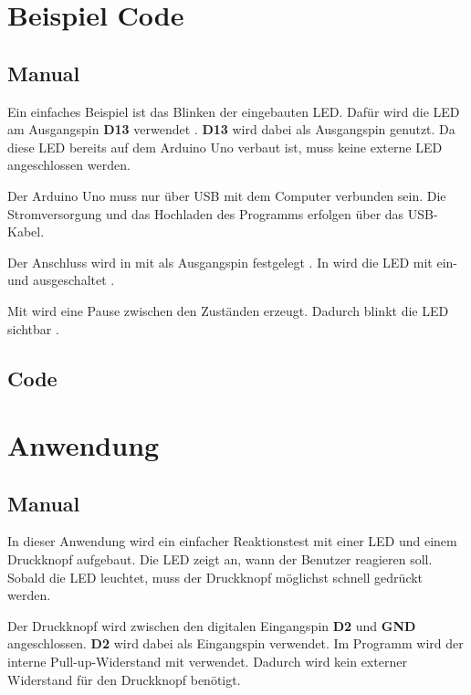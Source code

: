 \section{Beispiel Code}

\subsection{Manual}

Ein einfaches Beispiel ist das Blinken der eingebauten LED. Dafür wird die LED am Ausgangspin \textbf{D13} verwendet \cite{arduino:uno-components}. \textbf{D13} wird dabei als Ausgangspin genutzt. Da diese LED bereits auf dem Arduino Uno verbaut ist, muss keine externe LED angeschlossen werden.

Der Arduino Uno muss nur über USB mit dem Computer verbunden sein. Die Stromversorgung und das Hochladen des Programms erfolgen über das USB-Kabel.

Der Anschluss wird in  mit  als Ausgangspin festgelegt \cite{arduino_pinmode}. In  wird die LED mit  ein- und ausgeschaltet \cite{arduino_digitalwrite}.

Mit  wird eine Pause zwischen den Zuständen erzeugt. Dadurch blinkt die LED sichtbar \cite{arduino:language-reference}.

\subsection{Code}

{
	\label{lst:BlinkInternalLED}
}

\section{Anwendung}

\subsection{Manual}

In dieser Anwendung wird ein einfacher Reaktionstest mit einer LED und einem Druckknopf aufgebaut. Die LED zeigt an, wann der Benutzer reagieren soll. Sobald die LED leuchtet, muss der Druckknopf möglichst schnell gedrückt werden.

Der Druckknopf wird zwischen den digitalen Eingangspin \textbf{D2} und \textbf{GND} angeschlossen. \textbf{D2} wird dabei als Eingangspin verwendet. Im Programm wird der interne Pull-up-Widerstand mit  verwendet. Dadurch wird kein externer Widerstand für den Druckknopf benötigt.

